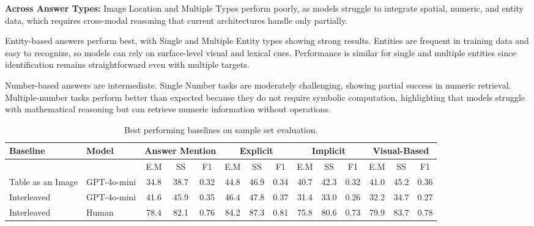 \documentclass[11pt]{article}
\begin{document}
\noindent\textbf{Across Answer Types:}
Image Location and Multiple Types perform poorly, as models struggle to integrate spatial, numeric, and entity data, which requires cross-modal reasoning that current architectures handle only partially.

Entity-based answers perform best, with Single and Multiple Entity types showing strong results. Entities are frequent in training data and easy to recognize, so models can rely on surface-level visual and lexical cues. Performance is similar for single and multiple entities since identification remains straightforward even with multiple targets.

Number-based answers are intermediate. Single Number tasks are moderately challenging, showing partial success in numeric retrieval. Multiple-number tasks perform better than expected because they do not require symbolic computation, highlighting that models struggle with mathematical reasoning but can retrieve numeric information without operations.

\begin{table}[!htbp]
\centering
\small
\setlength{\aboverulesep}{0pt}
\setlength{\belowrulesep}{0pt}
\setlength{\tabcolsep}{3pt}
\begin{tabular}{@{}l|l|ccc|ccc|ccc|ccc@{}}
\toprule
\textbf{Baseline} & \textbf{Model} & 
\multicolumn{3}{c|}{\textbf{Answer Mention}} & 
\multicolumn{3}{c|}{\textbf{Explicit}} & 
\multicolumn{3}{c|}{\textbf{Implicit}} & 
\multicolumn{3}{c}{\textbf{Visual-Based}} \\
\midrule
& & E.M & SS & F1 & E.M & SS & F1 & E.M & SS & F1 & E.M & SS & F1 \\
\midrule
Table as an Image & GPT-4o-mini & 34.8 & 38.7 & 0.32 & 44.8 & 46.9 & 0.34 & 40.7 & 42.3 & 0.32 & 41.0 & 45.2 & 0.36 \\
Interleaved & GPT-4o-mini & 41.6 & 45.9 & 0.35 & 46.4 & 47.8 & 0.37 & 31.4 & 33.0 & 0.26 & 32.2 & 34.7 & 0.27 \\
Interleaved & Human & 78.4 & 82.1 & 0.76 & 84.2 & 87.3 & 0.81 & 75.8 & 80.6 & 0.73 & 79.9 & 83.7 & 0.78 \\
\bottomrule
\end{tabular}
\vspace{-0.5em}
\caption{\small Best performing baselines on sample set evaluation.}
\label{baseline_performance}
\vspace{-0.5em}
\end{table}
\end{document}
